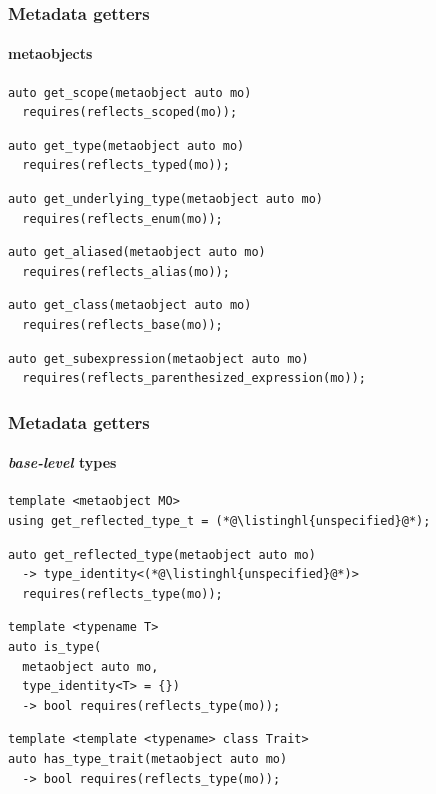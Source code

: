 \documentclass[compress,table,xcolor=table]{beamer}
\begin{document}
\begin{frame}[fragile]
  \frametitle{Metadata getters}
  \framesubtitle{metaobjects}
 \begin{lstlisting}[language=c++2x,basicstyle=\small\ttfamily]
auto get_scope(metaobject auto mo)
  requires(reflects_scoped(mo));
  \end{lstlisting}
  \vfill
  \begin{lstlisting}[language=c++2x,basicstyle=\small\ttfamily]
auto get_type(metaobject auto mo)
  requires(reflects_typed(mo));
  \end{lstlisting}
  \vfill
  \begin{lstlisting}[language=c++2x,basicstyle=\small\ttfamily]
auto get_underlying_type(metaobject auto mo)
  requires(reflects_enum(mo));
  \end{lstlisting}
  \vfill
  \begin{lstlisting}[language=c++2x,basicstyle=\small\ttfamily]
auto get_aliased(metaobject auto mo)
  requires(reflects_alias(mo));
  \end{lstlisting}
  \vfill
  \begin{lstlisting}[language=c++2x,basicstyle=\small\ttfamily]
auto get_class(metaobject auto mo)
  requires(reflects_base(mo));
  \end{lstlisting}
  \vfill
  \begin{lstlisting}[language=c++2x,basicstyle=\footnotesize\ttfamily]
auto get_subexpression(metaobject auto mo)
  requires(reflects_parenthesized_expression(mo));
  \end{lstlisting}
\end{frame}
\begin{frame}[fragile]
  \frametitle{Metadata getters}
  \framesubtitle{{\em base-level} types}
 \begin{lstlisting}[language=c++2x,basicstyle=\small\ttfamily]
template <metaobject MO>
using get_reflected_type_t = (*@\listinghl{unspecified}@*);
  \end{lstlisting}
  \vfill
  \begin{lstlisting}[language=c++2x,basicstyle=\small\ttfamily]
auto get_reflected_type(metaobject auto mo)
  -> type_identity<(*@\listinghl{unspecified}@*)>
  requires(reflects_type(mo));
  \end{lstlisting}
  \vfill
  \begin{lstlisting}[language=c++2x,basicstyle=\small\ttfamily]
template <typename T>
auto is_type(
  metaobject auto mo,
  type_identity<T> = {})
  -> bool requires(reflects_type(mo));
  \end{lstlisting}
  \vfill
  \begin{lstlisting}[language=c++2x,basicstyle=\small\ttfamily]
template <template <typename> class Trait>
auto has_type_trait(metaobject auto mo) 
  -> bool requires(reflects_type(mo));
  \end{lstlisting}
\end{frame}
\end{document}
